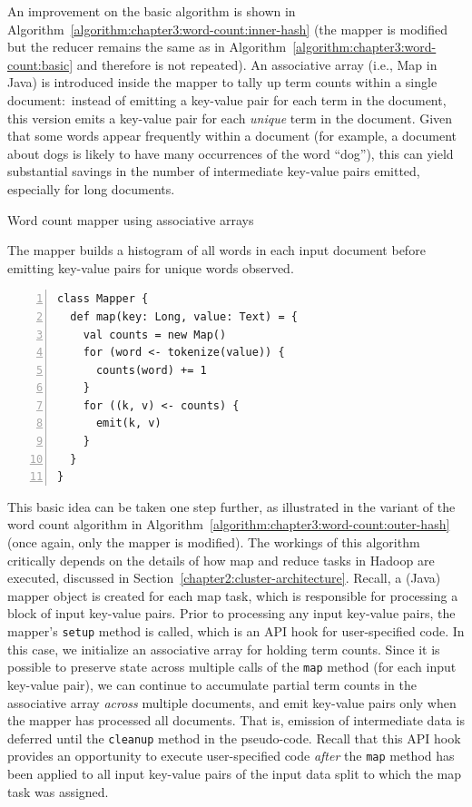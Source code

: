 \documentclass[11pt]{article}
\begin{document}
An improvement on the basic algorithm is shown in
Algorithm~\ref{algorithm:chapter3:word-count:inner-hash} (the mapper is
modified but the reducer remains the same as in
Algorithm~\ref{algorithm:chapter3:word-count:basic} and therefore is not
repeated).  An associative array (i.e., Map in Java) is introduced
inside the mapper to tally up term counts within a single
document:\ instead of emitting a key-value pair for each term in the
document, this version emits a key-value pair for each \emph{unique}
term in the document.  Given that some words appear frequently within
a document (for example, a document about dogs is likely to have many
occurrences of the word ``dog''), this can yield substantial savings
in the number of intermediate key-value pairs emitted, especially for
long documents.

\begin{algorithm}[t]
\caption{Word count mapper using associative arrays}
\label{algorithm:chapter3:word-count:inner-hash}
The mapper builds a histogram of all words in each input document
before emitting key-value pairs for unique words observed.
\begin{small}
\begin{Verbatim}[numbers=left, xleftmargin=7.5mm]
class Mapper {
  def map(key: Long, value: Text) = {
    val counts = new Map()
    for (word <- tokenize(value)) {
      counts(word) += 1
    }
    for ((k, v) <- counts) {
      emit(k, v)
    }
  }
}
\end{Verbatim}
\end{small}
\end{algorithm}

This basic idea can be taken one step further, as illustrated in the
variant of the word count algorithm in
Algorithm~\ref{algorithm:chapter3:word-count:outer-hash} (once again, only
the mapper is modified).  The workings of this algorithm critically
depends on the details of how map and reduce tasks in Hadoop are
executed, discussed in Section~\ref{chapter2:cluster-architecture}.
Recall, a (Java) mapper object is created for each map task, which is
responsible for processing a block of input key-value pairs.  Prior to
processing any input key-value pairs, the mapper's \texttt{setup}
method is called, which is an API hook for user-specified code.  In
this case, we initialize an associative array for holding term counts.
Since it is possible to preserve state across multiple calls of the
\texttt{map} method (for each input key-value pair), we can continue
to accumulate partial term counts in the associative array \emph{
  across} multiple documents, and emit key-value pairs only when the
mapper has processed all documents.  That is, emission of intermediate
data is deferred until the \texttt{cleanup} method in the pseudo-code.
Recall that this API hook provides an opportunity to execute
user-specified code \emph{after} the \texttt{map} method has been
applied to all input key-value pairs of the input data split to which
the map task was assigned.
\end{document}
